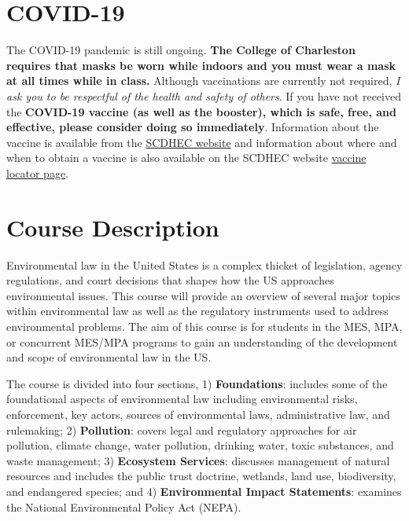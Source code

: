 \hypertarget{covid-19}{%
\section{COVID-19}\label{covid-19}}

The COVID-19 pandemic is still ongoing. \textbf{The College of
Charleston requires that masks be worn while indoors and you must wear a
mask at all times while in class.} Although vaccinations are currently
not required, \emph{I ask you to be respectful of the health and safety
of others}. If you have not received the \textbf{COVID-19 vaccine (as
well as the booster), which is safe, free, and effective, please
consider doing so immediately}. Information about the vaccine is
available from the
\href{https://scdhec.gov/covid19/covid-19-vaccine}{SCDHEC website} and
information about where and when to obtain a vaccine is also available
on the SCDHEC website \href{https://vaxlocator.dhec.sc.gov/}{vaccine
locator page}.

\hypertarget{course-description}{%
\section{Course Description}\label{course-description}}

Environmental law in the United States is a complex thicket of
legislation, agency regulations, and court decisions that shapes how the
US approaches environmental issues. This course will provide an overview
of several major topics within environmental law as well as the
regulatory instruments used to address environmental problems. The aim
of this course is for students in the MES, MPA, or concurrent MES/MPA
programs to gain an understanding of the development and scope of
environmental law in the US.

\vspace{0.1in}

\noindent The course is divided into four sections, 1)
\textbf{Foundations}: includes some of the foundational aspects of
environmental law including environmental risks, enforcement, key
actors, sources of environmental laws, administrative law, and
rulemaking; 2) \textbf{Pollution}: covers legal and regulatory
approaches for air pollution, climate change, water pollution, drinking
water, toxic substances, and waste management; 3) \textbf{Ecosystem
Services}: discusses management of natural resources and includes the
public trust doctrine, wetlands, land use, biodiversity, and endangered
species; and 4) \textbf{Environmental Impact Statements}: examines the
National Environmental Policy Act (NEPA).

